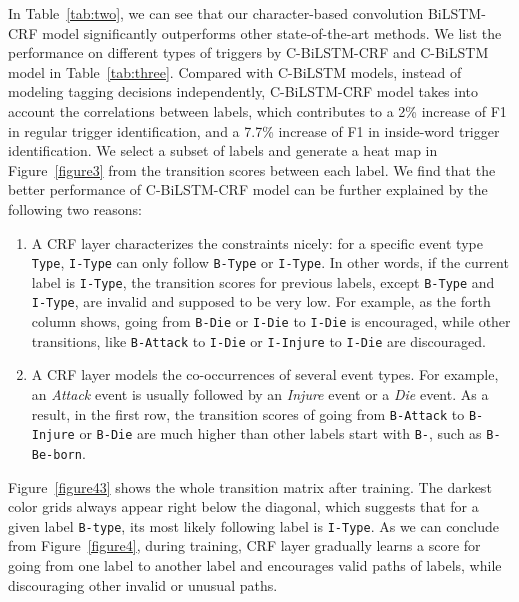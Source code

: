 In Table~\ref{tab:two}, we can see that our character-based convolution BiLSTM-CRF model significantly outperforms other state-of-the-art methods. We list the performance on different types of triggers by C-BiLSTM-CRF and C-BiLSTM model in Table~\ref{tab:three}. Compared with C-BiLSTM models, instead of modeling tagging decisions independently, C-BiLSTM-CRF model takes into account the correlations between labels, which contributes to a 2\% increase of F1 in regular trigger identification, and a 7.7\% increase of F1 in inside-word trigger identification.
We select a subset of labels and generate a heat map in Figure~\ref{figure3} from the transition scores between each label. We find that the better performance of C-BiLSTM-CRF model can be further explained by the following two reasons:
\begin{enumerate}
	\item A CRF layer characterizes the constraints nicely: for a specific event type \texttt{Type}, \texttt{I-Type} can only follow \texttt{B-Type} or \texttt{I-Type}. In other words, if the current label is \texttt{I-Type}, the transition scores for previous labels, except \texttt{B-Type} and \texttt{I-Type}, are invalid and supposed to be very low. For example, as the forth column shows, going from \texttt{B-Die} or \texttt{I-Die} to \texttt{I-Die} is encouraged, while other transitions, like \texttt{B-Attack} to \texttt{I-Die} or \texttt{I-Injure} to \texttt{I-Die} are discouraged.
	\item A CRF layer models the co-occurrences of several event types. For example, an \emph{Attack} event is usually followed by an \emph{Injure} event or a \emph{Die} event. As a result, in the first row, the transition scores of going from \texttt{B-Attack} to \texttt{B-Injure} or \texttt{B-Die} are much higher than other labels start with \texttt{B-}, such as \texttt{B-Be-born}.
\end{enumerate}

Figure~\ref{figure43} shows the whole transition matrix after training. The darkest color grids always appear right below the diagonal, which suggests that for a given label \texttt{B-type}, its most likely following label is \texttt{I-Type}. As we can conclude from Figure~\ref{figure4}, during training, CRF layer gradually learns a score for going from one label to another label and encourages valid paths of labels, while discouraging other invalid or unusual paths.

